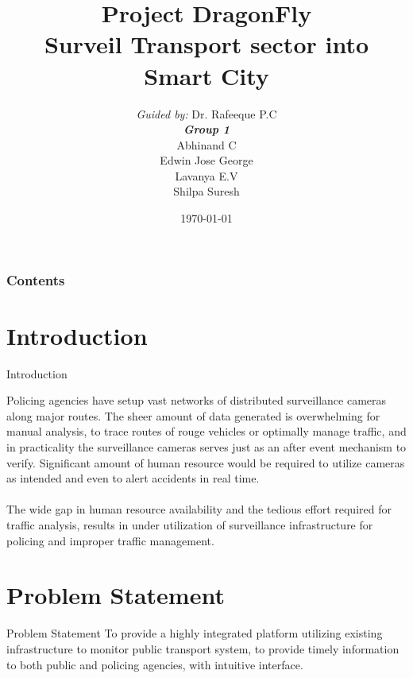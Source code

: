 \documentclass{beamer}
\title[DragonFly]{Project DragonFly \\ Surveil Transport sector into Smart City}
\author[Group 3]{
	{\small \textit{Guided by:}} Dr. Rafeeque P.C \\
	\medskip
	{\small \textbf{\textit{Group 1}}} \\
	Abhinand C \\
	Edwin Jose George \\
	Lavanya E.V \\
	Shilpa Suresh
}
\institute[GCEK]{Government College of Engineering Kannur}
\date{\today}
\begin{document}
\begin{frame}
\titlepage
\end{frame}

\begin{frame}
\frametitle{Contents}
\tableofcontents
\end{frame}


\section{Introduction}
\begin{frame}{Introduction}
	
    Policing agencies have setup vast networks of distributed surveillance cameras along major routes. The sheer amount of data generated is overwhelming for manual analysis, to trace routes of rouge vehicles or optimally manage traffic, and in practicality the surveillance cameras serves just as an after event mechanism to verify. Significant amount of human resource would be required to utilize cameras as intended and even to alert accidents in real time. \\~\\
    
    The wide gap in human resource availability and the tedious effort required for traffic analysis, results in under utilization of surveillance infrastructure for policing and improper traffic management.
    
\end{frame}
\section{Problem Statement}
\begin{frame}{Problem Statement}
	To provide a highly integrated platform utilizing existing infrastructure to monitor public transport system, to provide timely information to both public and policing agencies, with intuitive interface.
\end{frame}
\end{document}
